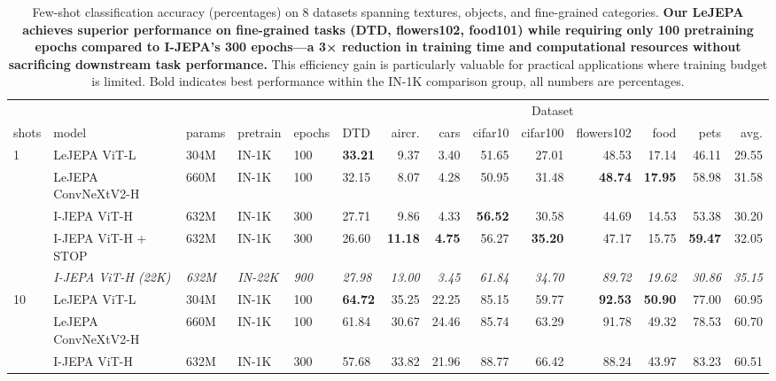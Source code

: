 \begin{table}[t!]
\small
\centering
\setlength{\tabcolsep}{3pt}
\caption{Few-shot classification accuracy (percentages) on 8 datasets spanning textures, objects, and fine-grained categories. \textbf{Our LeJEPA achieves superior performance on fine-grained tasks (DTD, flowers102, food101) while requiring only 100 pretraining epochs compared to I-JEPA's 300 epochs—a 3× reduction in training time and computational resources without sacrificing downstream task performance.} This efficiency gain is particularly valuable for practical applications where training budget is limited. Bold indicates best performance within the IN-1K comparison group, all numbers are percentages.}
\label{tab:transfer}
\begin{tabular}{llllllrrrrrrr|r}
\toprule
 & & & & & \multicolumn{9}{c}{Dataset} \\
\cmidrule(lr){6-14}
shots & model & params & pretrain & epochs & DTD & aircr. & cars & cifar10 & cifar100 & flowers102 & food & pets & avg. \\
\midrule
\multirow[c]{5}{*}{1} & LeJEPA ViT-L & 304M & IN-1K & 100 & \textbf{33.21} & 9.37 & 3.40 & 51.65 & 27.01 & 48.53 & 17.14 & 46.11 & 29.55 \\
 & LeJEPA ConvNeXtV2-H & 660M & IN-1K & 100 & 32.15 & 8.07 & 4.28 & 50.95 & 31.48 & \textbf{48.74} & \textbf{17.95} & 58.98 & 31.58 \\
 & I-JEPA ViT-H & 632M & IN-1K & 300 & 27.71 & 9.86 & 4.33 & \textbf{56.52} & 30.58 & 44.69 & 14.53 & 53.38 & 30.20 \\
 & I-JEPA ViT-H + STOP & 632M & IN-1K & 300 & 26.60 & \textbf{11.18} & \textbf{4.75} & 56.27 & \textbf{35.20} & 47.17 & 15.75 & \textbf{59.47} & 32.05 \\
\cmidrule{2-14}
 & \textit{I-JEPA ViT-H (22K)} & \textit{632M} & \textit{IN-22K} & \textit{900} & \textit{27.98} & \textit{13.00} & \textit{3.45} & \textit{61.84} & \textit{34.70} & \textit{89.72} & \textit{19.62} & \textit{30.86} & \textit{35.15} \\
\midrule
\multirow[c]{5}{*}{10} & LeJEPA ViT-L & 304M & IN-1K & 100 & \textbf{64.72} & 35.25 & 22.25 & 85.15 & 59.77 & \textbf{92.53} & \textbf{50.90} & 77.00 & 60.95 \\
 & LeJEPA ConvNeXtV2-H & 660M & IN-1K & 100 & 61.84 & 30.67 & 24.46 & 85.74 & 63.29 & 91.78 & 49.32 & 78.53 & 60.70 \\
 & I-JEPA ViT-H & 632M & IN-1K & 300 & 57.68 & 33.82 & 21.96 & 88.77 & 66.42 & 88.24 & 43.97 & 83.23 & 60.51 \\

\end{tabular}
\end{table}
